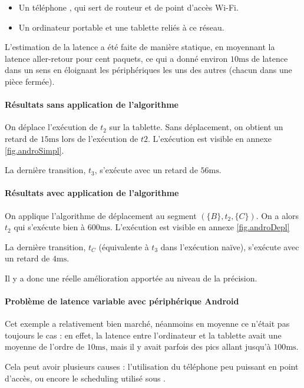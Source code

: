 \begin{itemize}
	\item Un téléphone , qui sert de routeur et de point d'accès Wi-Fi.
	\item Un ordinateur portable et une tablette  reliés à ce réseau.
\end{itemize}

L'estimation de la latence a été faite de manière statique, en moyennant la latence aller-retour pour cent paquets, ce qui a donné environ $\num{10} \si{\milli\second}$ de latence dans un sens en éloignant les périphériques les uns des autres (chacun dans une pièce fermée).

\paragraph{Résultats sans application de l'algorithme}
On déplace l'exécution de $t_2$ sur la tablette.
Sans déplacement, on obtient un retard de $\num{15} \si{\milli\second}$  lors de l'exécution de $t2$. L'exécution est visible en annexe \ref{fig.androSimpl}.

La dernière transition, $t_3$, s'exécute avec un retard de $\num{56} \si{\milli\second}$.

\paragraph{Résultats avec application de l'algorithme}
On applique l'algorithme de déplacement au segment $(\lbrace B \rbrace, t_2, \lbrace C \rbrace)$. On a alors $t_2$ qui s'exécute bien à $\num{600}\si{\milli\second}$. L'exécution est visible en annexe \ref{fig.androDepl}

La dernière transition, $t_C$ (équivalente à $t_3$ dans l'exécution naïve), s'exécute avec un retard de $\num{4} \si{\milli\second}$.

Il y a donc une réelle amélioration apportée au niveau de la précision.

\paragraph{Problème de latence variable avec périphérique Android}
Cet exemple a relativement bien marché, néanmoins en moyenne ce n'était pas toujours le cas : en effet, la latence entre l'ordinateur et la tablette  avait une moyenne de l'ordre de $\num{10} \si{\milli\second}$, mais il y avait parfois des pics allant jusqu'à $\num{100} \si{\milli\second}$.

Cela peut avoir plusieurs causes : l'utilisation du téléphone peu puissant en point d'accès, ou encore le scheduling utilisé sous .